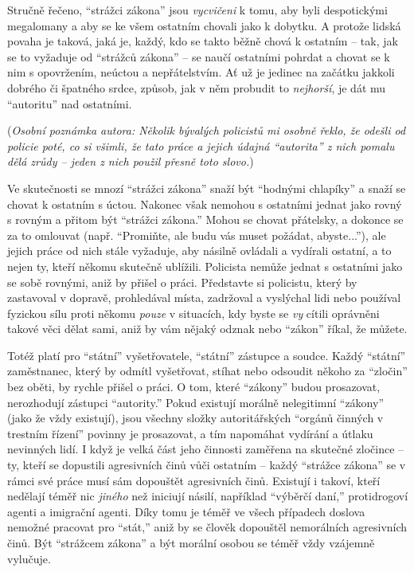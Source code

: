 \documentclass{book}
\begin{document}
Stručně řečeno, \enquote{strážci zákona} jsou \emph{vycvičeni} k tomu, aby byli despotickými megalomany a aby se ke všem ostatním chovali jako k dobytku. A protože lidská povaha je taková, jaká je, každý, kdo se takto běžně chová k ostatním -- tak, jak se to vyžaduje od \enquote{strážců zákona} -- se naučí ostatními pohrdat a chovat se k nim s opovržením, neúctou a nepřátelstvím. Ať už je jedinec na začátku jakkoli dobrého či špatného srdce, způsob, jak v něm probudit to \emph{nejhorší}, je dát mu \enquote{autoritu} nad ostatními.

(\emph{Osobní poznámka autora: Několik bývalých policistů mi osobně řeklo, že odešli od policie poté, co si všimli, že tato práce a jejich údajná \enquote{autorita} z nich pomalu dělá zrůdy -- jeden z nich použil přesně toto slovo.})

Ve skutečnosti se mnozí \enquote{strážci zákona} snaží být \enquote{hodnými chlapíky} a snaží se chovat k ostatním s úctou. Nakonec však nemohou s ostatními jednat jako rovný s rovným a přitom být \enquote{strážci zákona.} Mohou se chovat přátelsky, a dokonce se za to omlouvat (např. \enquote{Promiňte, ale budu vás muset požádat, abyste...}), ale jejich práce od nich stále vyžaduje, aby násilně ovládali a vydírali ostatní, a to nejen ty, kteří někomu skutečně ublížili. Policista nemůže jednat s ostatními jako se sobě rovnými, aniž by přišel o práci. Představte si policistu, který by zastavoval v dopravě, prohledával místa, zadržoval a vyslýchal lidi nebo používal fyzickou sílu proti někomu \emph{pouze} v situacích, kdy byste se \emph{vy} cítili oprávněni takové věci dělat sami, aniž by vám nějaký odznak nebo \enquote{zákon} říkal, že můžete.

Totéž platí pro \enquote{státní} vyšetřovatele, \enquote{státní} zástupce a soudce. Každý \enquote{státní} zaměstnanec, který by odmítl vyšetřovat, stíhat nebo odsoudit někoho za \enquote{zločin} bez oběti, by rychle přišel o práci. O tom, které \enquote{zákony} budou prosazovat, nerozhodují zástupci \enquote{autority.} Pokud existují morálně nelegitimní \enquote{zákony} (jako že vždy existují), jsou všechny složky autoritářských \enquote{orgánů činných v trestním řízení} povinny je prosazovat, a tím napomáhat vydírání a útlaku nevinných lidí. I když je velká část jeho činnosti zaměřena na skutečné zločince -- ty, kteří se dopustili agresivních činů vůči ostatním -- každý \enquote{strážce zákona} se v rámci své práce musí sám dopouštět agresivních činů. Existují i takoví, kteří nedělají téměř nic \emph{jiného} než iniciují násilí, například \enquote{výběrčí daní,} protidrogoví agenti a imigrační agenti. Díky tomu je téměř ve všech případech doslova nemožné pracovat pro \enquote{stát,} aniž by se člověk dopouštěl nemorálních agresivních činů. Být \enquote{strážcem zákona} a být morální osobou se téměř vždy vzájemně vylučuje.
\end{document}
